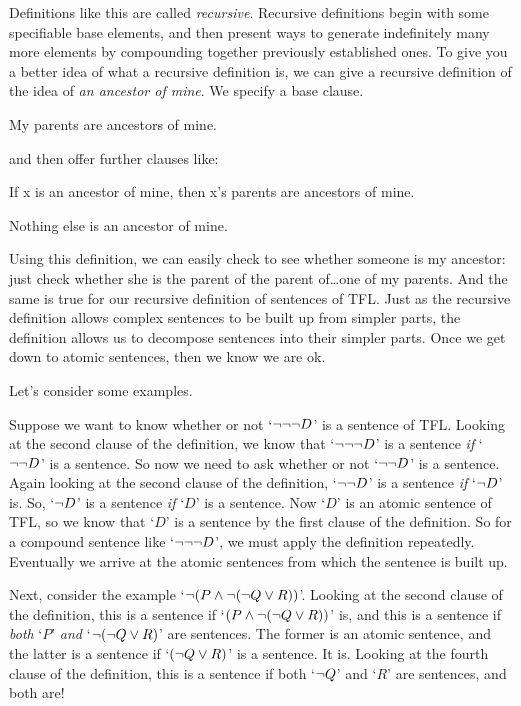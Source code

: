 Definitions like this are called \emph{recursive}. Recursive definitions begin with some specifiable base elements, and then present ways to generate indefinitely many more elements by compounding together previously established ones. To give you a better idea of what a recursive definition is, we can give a recursive definition of the idea of \emph{an ancestor of mine}. We specify a base clause.
	\begin{ebullet}
		\item My parents are ancestors of mine.
	\end{ebullet}
and then offer further clauses like:
	\begin{ebullet}
		\item If x is an ancestor of mine, then x's parents are ancestors of mine.
		\item Nothing else is an ancestor of mine.
	\end{ebullet}
Using this definition, we can easily check to see whether someone is my ancestor: just check whether she is the parent of the parent of\ldots one of my parents. And the same is true for our recursive definition of sentences of TFL. Just as the recursive definition allows complex sentences to be built up from simpler parts, the definition allows us to decompose sentences into their simpler parts. Once we get down to atomic sentences, then we know we are ok. 

Let's consider some examples.

Suppose we want to know whether or not `$\neg \neg \neg D$' is a sentence of TFL. Looking at the second clause of the definition, we know that `$\neg \neg \neg D$' is a sentence \emph{if} `$\neg \neg D$' is a sentence. So now we need to ask whether or not `$\neg \neg D$' is a sentence. Again looking at the second clause of the definition, `$\neg \neg D$' is a sentence \emph{if} `$\neg D$' is. So, `$\neg D$' is a sentence \emph{if} `$D$' is a sentence. Now `$D$' is an atomic sentence of TFL, so we know that `$D$' is a sentence by the first clause of the definition. So for a compound sentence like `$\neg \neg \neg D$', we must apply the definition repeatedly. Eventually we arrive at the atomic sentences from which the sentence is built up.

Next, consider the example `$\neg (P \wedge \neg (\neg Q \vee R))$'. Looking at the second clause of the definition, this is a sentence if `$(P \wedge \neg (\neg Q \vee R))$' is, and this is a sentence if \emph{both} `$P$' \emph{and} `$\neg (\neg Q \vee R)$' are sentences. The former is an atomic sentence, and the latter is a sentence if `$(\neg Q \vee R)$' is a sentence. It is. Looking at the fourth clause of the definition, this is a sentence if both `$\neg Q$' and `$R$' are sentences, and both are! 



